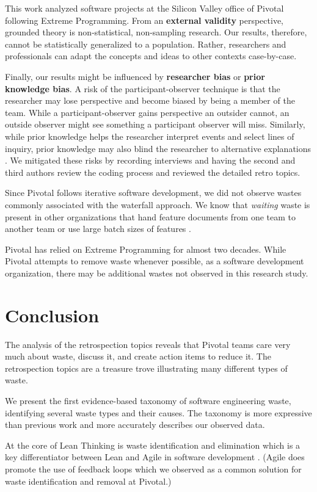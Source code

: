 This work analyzed software projects at the Silicon Valley office of Pivotal following Extreme Programming. From an \textbf{external validity} perspective, grounded theory is non-statistical, non-sampling research. Our results, therefore, cannot be statistically generalized to a population. Rather, researchers and professionals can adapt the concepts and ideas to other contexts case-by-case.

Finally, our results might be influenced by \textbf{researcher bias} or \textbf{prior knowledge bias}. A risk of the participant-observer technique is that the researcher may lose perspective and become biased by being a member of the team. While a participant-observer gains perspective an outsider cannot, an outside observer might see something a participant observer will miss. Similarly, while prior knowledge helps the researcher interpret events and select lines of inquiry, prior knowledge may also blind the researcher to alternative explanations \cite{GlaserIssues}. We mitigated these risks by recording interviews and having the second and third authors review the coding process and reviewed the detailed retro topics.

Since Pivotal follows iterative software development, we did not observe wastes commonly associated with the waterfall approach. We know that \textit{waiting} waste is present in other organizations that hand feature documents from one team to another team or use large batch sizes of features \cite{Ali2016, Khurum2014, Mujtaba2010}.

Pivotal has relied on Extreme Programming for almost two decades. While Pivotal attempts to remove waste whenever possible, as a  software development organization, there may be additional wastes not observed in this research study. 
\section{Conclusion}
\label{Conclusion}
The analysis of the retrospection topics reveals that Pivotal teams care very much about waste, discuss it, and create action items to reduce it. The retrospection topics are a treasure trove illustrating many different types of waste.

We present the first evidence-based taxonomy of software engineering waste, identifying several waste types and their causes. The taxonomy is more expressive than previous work and more accurately describes our observed data.

At the core of Lean Thinking is waste identification and elimination \cite{WomackLeanThinking} which is a key differentiator between Lean and Agile in software development \cite{Fitzgerald2015continuous}. (Agile does promote the use of feedback loops which we observed as a common solution for waste identification and removal at Pivotal.)

